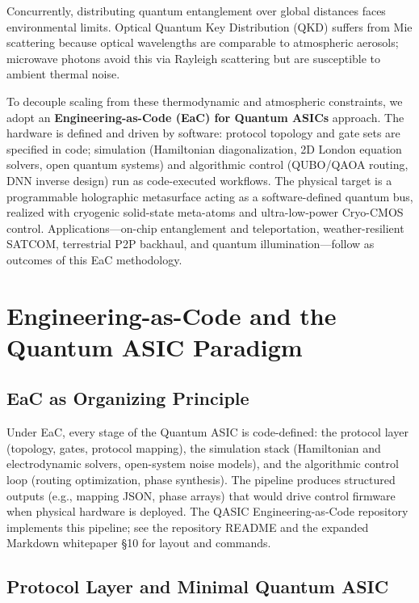 \documentclass[11pt, a4paper]{article}
\begin{document}
Concurrently, distributing quantum entanglement over global distances faces environmental limits. Optical Quantum Key Distribution (QKD) suffers from Mie scattering because optical wavelengths are comparable to atmospheric aerosols; microwave photons avoid this via Rayleigh scattering but are susceptible to ambient thermal noise\cite{ref1}.

To decouple scaling from these thermodynamic and atmospheric constraints, we adopt an \textbf{Engineering-as-Code (EaC) for Quantum ASICs} approach. The hardware is defined and driven by software: protocol topology and gate sets are specified in code; simulation (Hamiltonian diagonalization, 2D London equation solvers, open quantum systems) and algorithmic control (QUBO/QAOA routing, DNN inverse design) run as code-executed workflows. The physical target is a programmable holographic metasurface acting as a software-defined quantum bus, realized with cryogenic solid-state meta-atoms and ultra-low-power Cryo-CMOS control. Applications---on-chip entanglement and teleportation, weather-resilient SATCOM, terrestrial P2P backhaul, and quantum illumination---follow as outcomes of this EaC methodology.

\section{Engineering-as-Code and the Quantum ASIC Paradigm}

\subsection{EaC as Organizing Principle}

Under EaC, every stage of the Quantum ASIC is code-defined: the protocol layer (topology, gates, protocol mapping), the simulation stack (Hamiltonian and electrodynamic solvers, open-system noise models), and the algorithmic control loop (routing optimization, phase synthesis). The pipeline produces structured outputs (e.g., mapping JSON, phase arrays) that would drive control firmware when physical hardware is deployed. The QASIC Engineering-as-Code repository implements this pipeline; see the repository README and the expanded Markdown whitepaper §10 for layout and commands.

\subsection{Protocol Layer and Minimal Quantum ASIC}
\end{document}
